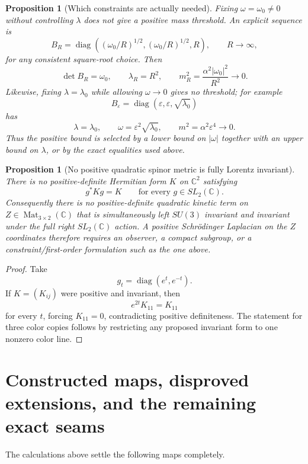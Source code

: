 \documentclass[11pt]{article}
\newtheorem{proposition}[theorem]{Proposition}
\theoremstyle{definition}
\newcommand{\C}{\mathbb C}
\newcommand{\Mat}{\operatorname{Mat}}
\newcommand{\diag}{\operatorname{diag}}
\begin{document}
\begin{proposition}[Which constraints are actually needed]\label{prop:needed-constraints}
Fixing $\omega=\omega_0\neq0$ without controlling $\lambda$ does not give a positive mass threshold.  An explicit sequence is
\[
 B_R=\diag\left((\omega_0/R)^{1/2},
                 (\omega_0/R)^{1/2},R\right),
 \qquad R\to\infty,
\]
for any consistent square-root choice.  Then
\[
 \det B_R=\omega_0,
 \qquad
 \lambda_R=R^2,
 \qquad
 m_R^2=\frac{\alpha^2|\omega_0|^2}{R^2}\longrightarrow0.
\]
Likewise, fixing $\lambda=\lambda_0$ while allowing $\omega\to0$ gives no threshold; for example
\[
 B_\varepsilon=\diag(\varepsilon,\varepsilon,\sqrt{\lambda_0})
\]
has
\[
 \lambda=\lambda_0,
 \qquad
 \omega=\varepsilon^2\sqrt{\lambda_0},
 \qquad
 m^2=\alpha^2\varepsilon^4\longrightarrow0.
\]
Thus the positive bound is selected by a lower bound on $|\omega|$ together with an upper bound on $\lambda$, or by the exact equalities used above.
\end{proposition}

\begin{proposition}[No positive quadratic spinor metric is fully Lorentz invariant]\label{prop:no-positive-kinetic}
There is no positive-definite Hermitian form $K$ on $\C^2$ satisfying
\[
 g^*Kg=K\qquad\text{for every }g\in SL_2(\C).
\]
Consequently there is no positive-definite quadratic kinetic term on $Z\in\Mat_{3\times2}(\C)$ that is simultaneously left $SU(3)$ invariant and invariant under the full right $SL_2(\C)$ action.  A positive Schr\"odinger Laplacian on the $Z$ coordinates therefore requires an observer, a compact subgroup, or a constraint/first-order formulation such as the one above.
\end{proposition}

\begin{proof}
Take
\[
 g_t=\diag(e^t,e^{-t}).
\]
If $K=(K_{ij})$ were positive and invariant, then
\[
 e^{2t}K_{11}=K_{11}
\]
for every $t$, forcing $K_{11}=0$, contradicting positive definiteness.  The statement for three color copies follows by restricting any proposed invariant form to one nonzero color line.
\end{proof}

\section{Constructed maps, disproved extensions, and the remaining exact seams}

The calculations above settle the following maps completely.
\end{document}
